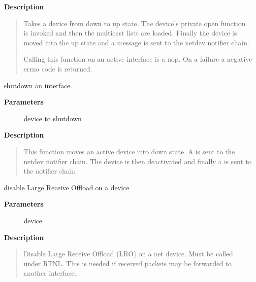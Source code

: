 \documentclass[a4paper,8pt,english]{sphinxmanual}
\begin{document}
\textbf{Description}
\begin{quote}

Takes a device from down to up state. The device's private open
function is invoked and then the multicast lists are loaded. Finally
the device is moved into the up state and a  message is
sent to the netdev notifier chain.

Calling this function on an active interface is a nop. On a failure
a negative errno code is returned.
\end{quote}

\begin{fulllineitems}
\label{networking/kapi:c.dev_close}
shutdown an interface.

\end{fulllineitems}


\textbf{Parameters}
\begin{description}
\item[{}] \leavevmode
device to shutdown

\end{description}

\textbf{Description}
\begin{quote}

This function moves an active device into down state. A
 is sent to the netdev notifier chain. The device
is then deactivated and finally a  is sent to the notifier
chain.
\end{quote}

\begin{fulllineitems}
\label{networking/kapi:c.dev_disable_lro}
disable Large Receive Offload on a device

\end{fulllineitems}


\textbf{Parameters}
\begin{description}
\item[{}] \leavevmode
device

\end{description}

\textbf{Description}
\begin{quote}

Disable Large Receive Offload (LRO) on a net device.  Must be
called under RTNL.  This is needed if received packets may be
forwarded to another interface.
\end{quote}
\end{document}
